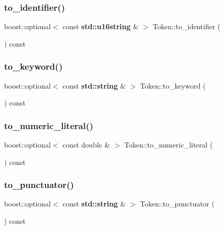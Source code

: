 \mbox{\label{class_token_a26d2e0e166ea03a4a7c2a7b77d456283}} 
\subsubsection{\texorpdfstring{to\+\_\+identifier()}{to\_identifier()}}
{\footnotesize\ttfamily boost\+::optional$<$ const \textbf{ std\+::u16string} \& $>$ Token\+::to\+\_\+identifier (\begin{DoxyParamCaption}{ }\end{DoxyParamCaption}) const}

\mbox{\label{class_token_a4438811e8b488dc71a8ae518368cc962}} 
\subsubsection{\texorpdfstring{to\+\_\+keyword()}{to\_keyword()}}
{\footnotesize\ttfamily boost\+::optional$<$ const \textbf{ std\+::string} \& $>$ Token\+::to\+\_\+keyword (\begin{DoxyParamCaption}{ }\end{DoxyParamCaption}) const}

\mbox{\label{class_token_a6f9a344002940cb1ee6e29a7ae9a178a}} 
\subsubsection{\texorpdfstring{to\+\_\+numeric\+\_\+literal()}{to\_numeric\_literal()}}
{\footnotesize\ttfamily boost\+::optional$<$ const double \& $>$ Token\+::to\+\_\+numeric\+\_\+literal (\begin{DoxyParamCaption}{ }\end{DoxyParamCaption}) const}

\mbox{\label{class_token_ad68665bd46eea1e372e6ed9dade2f713}} 
\subsubsection{\texorpdfstring{to\+\_\+punctuator()}{to\_punctuator()}}
{\footnotesize\ttfamily boost\+::optional$<$ const \textbf{ std\+::string} \& $>$ Token\+::to\+\_\+punctuator (\begin{DoxyParamCaption}{ }\end{DoxyParamCaption}) const}

